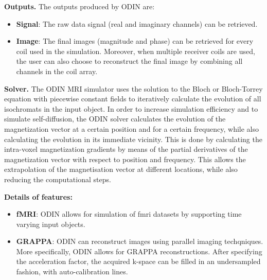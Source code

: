 \hfill

\textbf{Outputs.} The outputs produced by ODIN are:
\begin{itemize}
    
    \item \textbf{Signal}: The raw data signal (real and imaginary channels) can be retrieved.
    
    \item \textbf{Image}: The final images  (magnitude  and phase) can be retrieved for every coil used in the simulation.
    Moreover, when multiple receiver coils are used, the user can also choose to reconstruct the final image by combining all channels in the coil array.
    
\end{itemize}

\hfill

\textbf{Solver.} The ODIN MRI simulator uses the solution 
to the Bloch or Bloch-Torrey equation with piecewise constant fields to iteratively calculate the evolution of all isochromats in the input object.
In order to increase simulation efficiency and to simulate self-diffusion, the ODIN solver calculates the evolution of the magnetization vector at a certain position and for a certain frequency, while also calculating the evolution in its immediate vicinity.
This is done by calculating the intra-voxel magnetization gradients by means of the partial derivatives of the magnetization vector with respect to position and frequency.
This allows the extrapolation of the magnetisation vector at different locations, while also reducing the computational steps.

\hfill

\textbf{Details of features:}
\begin{itemize}
    
    \item \textbf{fMRI}: ODIN allows for simulation of \ac{fmri} datasets by supporting time varying input objects.
    
    \item \textbf{GRAPPA}: ODIN can reconstruct images using parallel imaging techqniques.
    More specifically, ODIN allows for GRAPPA reconstructions.
    After specifying the acceleration factor, the acquired k-space can be filled in an undersampled fashion, with auto-calibration lines.
    
\end{itemize}

\hfill

